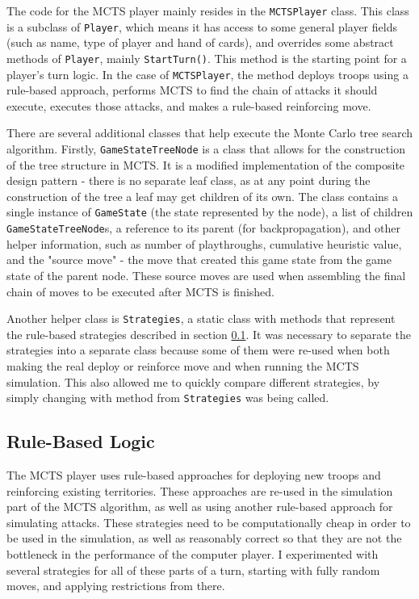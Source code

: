 The code for the MCTS player mainly resides in the \texttt{MCTSPlayer} class. This class is a subclass of \texttt{Player}, which means it has access to some general player fields (such as name, type of player and hand of cards), and overrides some abstract methods of \texttt{Player}, mainly \texttt{StartTurn()}. This method is the starting point for a player's turn logic. In the case of \texttt{MCTSPlayer}, the method deploys troops using a rule-based approach, performs MCTS to find the chain of attacks it should execute, executes those attacks, and makes a rule-based reinforcing move.

There are several additional classes that help execute the Monte Carlo tree search algorithm. Firstly, \texttt{GameStateTreeNode} is a class that allows for the construction of the tree structure in MCTS. It is a modified implementation of the composite design pattern - there is no separate leaf class, as at any point during the construction of the tree a leaf may get children of its own. The class contains a single instance of \texttt{GameState} (the state represented by the node), a list of children \texttt{GameStateTreeNode}s, a reference to its parent (for backpropagation), and other helper information, such as number of playthroughs, cumulative heuristic value, and the "source move" - the move that created this game state from the game state of the parent node. These source moves are used when assembling the final chain of moves to be executed after MCTS is finished.

Another helper class is \texttt{Strategies}, a static class with methods that represent the rule-based strategies described in section \ref{ruleBasedLogic}. It was necessary to separate the strategies into a separate class because some of them were re-used when both making the real deploy or reinforce move and when running the MCTS simulation. This also allowed me to quickly compare different strategies, by simply changing with method from \texttt{Strategies} was being called.

\subsection{Rule-Based Logic}
\label{ruleBasedLogic}

The MCTS player uses rule-based approaches for deploying new troops and reinforcing existing territories. These approaches are re-used in the simulation part of the MCTS algorithm, as well as using another rule-based approach for simulating attacks. These strategies need to be computationally cheap in order to be used in the simulation, as well as reasonably correct so that they are not the bottleneck in the performance of the computer player. I experimented with several strategies for all of these parts of a turn, starting with fully random moves, and applying restrictions from there.

